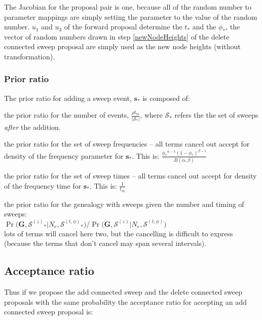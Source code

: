 \documentclass[letterpaper]{article}
\newcommand{\sweep}[1]{{\ensuremath{\mathbf{s}_{#1}}}}
\newcommand{\sweeptime}[1]{{\ensuremath{t_{#1}}}}
\newcommand{\sweepfreq}[1]{{\ensuremath{\phi_{#1}}}}
\newcommand{\genealogy}{{\ensuremath{\mathbf{G}}}}
\newcommand{\popsize}{{\ensuremath{N_e}}}
\newcommand{\ratesweep}{{\ensuremath{\rho}}}
\newcommand{\sweepalpha}{{\ensuremath{\alpha}}}
\newcommand{\sweepbeta}{{\ensuremath{\beta}}}
\newcommand{\entireSweepSet}{{\ensuremath{\mathcal{S}}}}
\newcommand{\sweepsetLocs}{{\ensuremath{\entireSweepSet^{(z)}}}}
\newcommand{\sweepsetTFs}{{\ensuremath{\entireSweepSet^{(t,\phi)}}}}
\begin{document}
The Jacobian for the proposal pair is one, because all of the random number to parameter mappings are simply setting the parameter to the value of the random number.
$u_1$ and $u_3$ of the forward proposal determine the $\sweeptime{*}$ and the $\sweepfreq{*}$, the vector of random numbers drawn in step \ref{newNodeHeights} of the delete connected sweep proposal are simply used as the new node heights (without transformation).

\subsubsection{Prior ratio}
The prior ratio for adding a sweep event, $\sweep{*}$ is composed of:
\begin{compactitem}
	\item the prior ratio for the number of events,  $\frac{\ratesweep t_m}{|\entireSweepSet_{*}|}$, where $\entireSweepSet_{*}$ refers the the set of sweeps {\em after} the addition. 
	\item the prior ratio for the set of sweep frequencies -- all terms cancel out accept for density of the frequency parameter for $\sweep{*}$. This is: $\frac{\sweepfreq{*}^{\sweepalpha-1}\left(1-\sweepfreq{*}\right)^{\sweepbeta-1}}{B(\sweepalpha, \sweepbeta)}$
	\item the prior ratio for the set of sweep times -- all terms cancel out accept for density of the frequency time for $\sweep{*}$. This is: $\frac{1}{t_m}$
	\item the prior ratio for the genealogy with sweeps given the number and timing of sweeps: \\$\Pr\Big(\genealogy, \sweepsetLocs_{*} \Big| \popsize, \sweepsetTFs_{*} \Big)/\Pr\Big(\genealogy, \sweepsetLocs \Big| \popsize, \sweepsetTFs \Big)$\\
	lots of terms will cancel here two, but the cancelling is difficult to express (because the terms that don't cancel may span several intervals).
\end{compactitem}

\subsection{Acceptance ratio}
Thus if we propose the add connected sweep and the delete connected sweep proposals with the same probability the acceptance ratio for accepting an add connected sweep proposal is:
\end{document}

